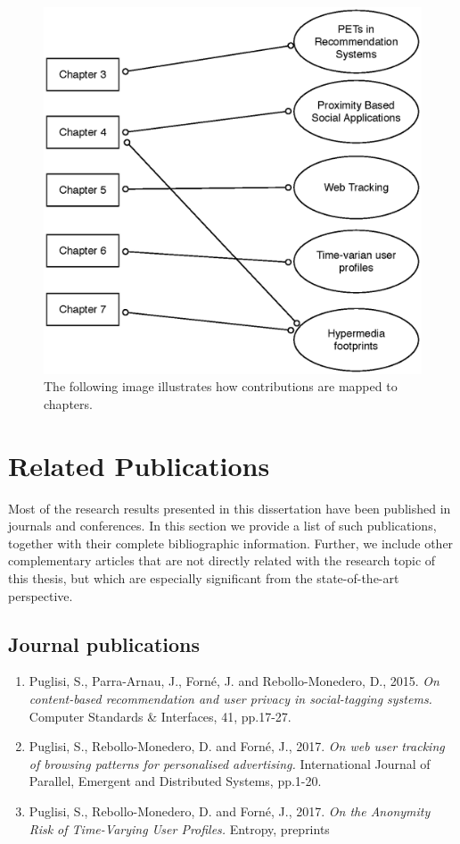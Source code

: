 \begin{figure}
\includegraphics[width=\textwidth]{figures/thesis-map.eps}
\caption[Advertising services feedback loop]{The following image illustrates how contributions are mapped to chapters.}
\label{fig:contributions}
\end{figure}

\section{Related Publications}

Most of the research results presented in this dissertation have been published in journals and conferences. In this section we provide a list of such publications, together with their complete bibliographic information. Further, we include other complementary articles that are not directly related with the research topic of this thesis, but which are especially
significant from the state-of-the-art perspective.

\subsection{Journal publications}
\begin{enumerate}
    \item Puglisi, S., Parra-Arnau, J., Forn\'e, J. and Rebollo-Monedero, D., 2015. \emph{On content-based recommendation and user privacy in social-tagging systems.} Computer Standards \& Interfaces, 41, pp.17-27.
          
    \item Puglisi, S., Rebollo-Monedero, D. and Forn\'e, J., 2017. \emph{On web user tracking of browsing patterns for personalised advertising.} International Journal of Parallel, Emergent and Distributed Systems, pp.1-20.
    
    \item Puglisi, S., Rebollo-Monedero, D. and Forn\'e, J., 2017. \emph{On the Anonymity Risk of Time-Varying User Profiles.}
          Entropy, preprints
\end{enumerate}


